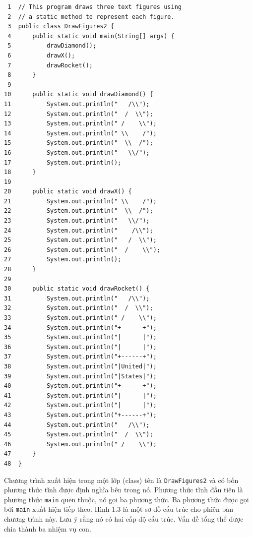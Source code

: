 \begin{verbatim}
 1  // This program draws three text figures using
 2  // a static method to represent each figure.
 3  public class DrawFigures2 {
 4      public static void main(String[] args) {
 5          drawDiamond();
 6          drawX();
 7          drawRocket();
 8      }
 9
10      public static void drawDiamond() {
11          System.out.println("   /\\");
12          System.out.println("  /  \\");
13          System.out.println(" /    \\");
14          System.out.println(" \\    /");
15          System.out.println("  \\  /");
16          System.out.println("   \\/");
17          System.out.println();
18      }
19
20      public static void drawX() {
21          System.out.println(" \\    /");
22          System.out.println("  \\  /");
23          System.out.println("   \\/");
24          System.out.println("    /\\");
25          System.out.println("   /  \\");
26          System.out.println("  /    \\");
27          System.out.println();
28      }
29
30      public static void drawRocket() {
31          System.out.println("   /\\");
32          System.out.println("  /  \\");
33          System.out.println(" /    \\");
34          System.out.println("+------+");
35          System.out.println("|      |");
36          System.out.println("|      |");
37          System.out.println("+------+");
38          System.out.println("|United|");
39          System.out.println("|States|");
40          System.out.println("+------+");
41          System.out.println("|      |");
42          System.out.println("|      |");
43          System.out.println("+------+");
44          System.out.println("   /\\");
45          System.out.println("  /  \\");
46          System.out.println(" /    \\");
47      }
48  }
\end{verbatim}

Chương trình xuất hiện trong một lớp (class) tên là
\texttt{DrawFigures2} và có bốn phương thức tĩnh được định nghĩa bên
trong nó. Phương thức tĩnh đầu tiên là phương thức \texttt{main} quen
thuộc, nó gọi ba phương thức. Ba phương thức được gọi bởi \texttt{main}
xuất hiện tiếp theo. Hình 1.3 là một sơ đồ cấu trúc cho phiên bản chương
trình này. Lưu ý rằng nó có hai cấp độ cấu trúc. Vấn đề tổng thể được
chia thành ba nhiệm vụ con.

